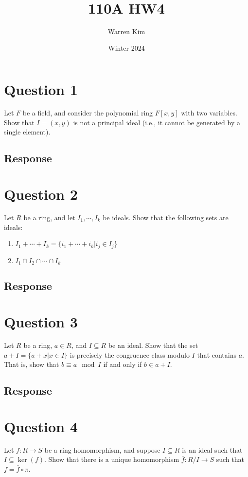 \documentclass [12pt] {article}
\title{110A HW4}
\author{Warren Kim}
\date{Winter 2024}
\begin{document}
\maketitle

\section*{Question 1}
Let $F$ be a field, and consider the polynomial ring $F[x,y]$ with two variables. Show that $I=(x,y)$ is not a principal ideal (i.e., it cannot be generated by a single element). 
\subsection*{Response}
\newpage

\section*{Question 2}
Let $R$ be a ring, and let $I_1,\cdots,I_k$ be ideals. Show that the following sets are ideals: 
    \begin{enumerate}
        \item $I_1+\cdots+I_k=\{i_1+\cdots+i_k|i_j\in I_j\}$
        \item $I_1\cap I_2\cap \cdots\cap I_k$
    \end{enumerate}
\subsection*{Response}
\newpage

\section*{Question 3}
Let $R$ be a ring, $a\in R$, and $I\subseteq R$ be an ideal. Show that the set $a+I=\{a+x|x\in I\}$ is precisely the congruence class modulo $I$ that contains $a$. That is, show that $b\equiv a\mod I$ if and only if $b\in a+I$. 
\subsection*{Response}
\newpage

\section*{Question 4}
Let $f:R\to S$ be a ring homomorphism, and suppose $I\subseteq R$ is an ideal such that $I\subseteq \ker(f)$. Show that there is a unique homomorphism $\overline{f}:R/I\to S$ such that $f=\overline{f}\circ\pi$.
\end{document}
